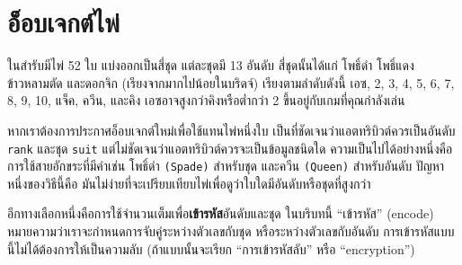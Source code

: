 \section{อ็อบเจกต์ไพ่} %


ในสำรับมีไพ่ 52 ใบ แบ่งออกเป็นสี่ชุด แต่ละชุดมี 13 อันดับ สี่ชุดนั้นได้แก่ โพธิ์ดำ โพธิ์แดง ข้าวหลามตัด และดอกจิก (เรียงจากมากไปน้อยในบริดจ์)
เรียงตามลำดับดังนี้ เอซ, 2, 3, 4, 5, 6, 7, 8, 9, 10, แจ็ค, ควีน, และคิง เอซอาจสูงกว่าคิงหรือต่ำกว่า 2 ขึ้นอยู่กับเกมที่คุณกำลังเล่น


หากเราต้องการประกาศอ็อบเจกต์ใหม่เพื่อใช้แทนไพ่หนึ่งใบ เป็นที่ชัดเจนว่าแอตทริบิวต์ควรเป็นอันดับ {\tt rank} และชุด {\tt suit} 
แต่ไม่ชัดเจนว่าแอตทริบิวต์ควรจะเป็นข้อมูลชนิดใด ความเป็นไปได้อย่างหนึ่งคือการใช้สายอักขระที่มีคำเช่น 
โพธิ์ดำ \verb"(Spade)" สำหรับชุด และควีน \verb"(Queen)" สำหรับอันดับ ปัญหาหนึ่งของวิธีนี้คือ มันไม่ง่ายที่จะเปรียบเทียบไพ่เพื่อดูว่าใบใดมีอันดับหรือชุดที่สูงกว่า



อีกทางเลือกหนึ่งคือการใช้จำนวนเต็มเพื่อ\textbf{เข้ารหัส}อันดับและชุด 
ในบริบทนี้ ``เข้ารหัส'' (encode) หมายความว่าเราจะกำหนดการจับคู่ระหว่างตัวเลขกับชุด หรือระหว่างตัวเลขกับอันดับ
การเข้ารหัสแบบนี้ไม่ได้ต้องการให้เป็นความลับ (ถ้าแบบนั้นจะเรียก ``การเข้ารหัสลับ'' หรือ ``encryption'')

